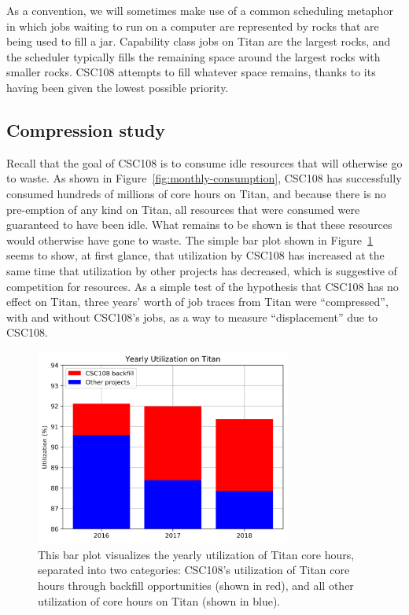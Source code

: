 As a convention, we will sometimes make use of a common scheduling metaphor in
which jobs waiting to run on a computer are represented by rocks that are being
used to fill a jar. Capability class jobs on Titan are the largest rocks, and
the scheduler typically fills the remaining space around the largest rocks
with smaller rocks. CSC108 attempts to fill whatever space remains, thanks
to its having been given the lowest possible priority.

\subsection{Compression study}
\label{subsec:compression-study}

Recall that the goal of CSC108 is to consume idle resources that will otherwise
go to waste. As shown in Figure~\ref{fig:monthly-consumption}, CSC108 has
successfully consumed hundreds of millions of core hours on Titan, and because
there is no pre-emption of any kind on Titan, all resources that were consumed
were guaranteed to have been idle. What remains to be shown is that these
resources would otherwise have gone to waste. The simple bar plot shown in
Figure~\ref{fig:jacks-slide} seems to show, at first glance, that utilization
by CSC108 has increased at the same time that utilization by other projects has
decreased, which is suggestive of competition for resources. As a simple test
of the hypothesis that CSC108 has no effect on Titan, three years' worth of job
traces from Titan were ``compressed'', with and without CSC108's jobs, as a way
to measure ``displacement'' due to CSC108.

\begin{figure}
  \includegraphics[width=0.75\textwidth]{images/barplot-jacks-slide.png}
\caption{This bar plot visualizes the yearly utilization of Titan core hours,
separated into two categories: CSC108's utilization of Titan core hours through
backfill opportunities (shown in red), and all other utilization of core hours
on Titan (shown in blue).}
\label{fig:jacks-slide}
\end{figure}

